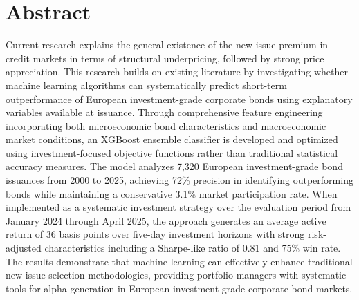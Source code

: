 \chapter*{Abstract}
\thispagestyle{empty} %

Current research explains the general existence of the new issue premium in credit markets in terms of structural underpricing, followed by strong price appreciation. This research builds on existing literature by investigating whether machine learning algorithms can systematically predict short-term outperformance of European investment-grade corporate bonds using explanatory variables available at issuance. Through comprehensive feature engineering incorporating both microeconomic bond characteristics and macroeconomic market conditions, an XGBoost ensemble classifier is developed and optimized using investment-focused objective functions rather than traditional statistical accuracy measures. The model analyzes 7,320 European investment-grade bond issuances from 2000 to 2025, achieving 72\% precision in identifying outperforming bonds while maintaining a conservative 3.1\% market participation rate. When implemented as a systematic investment strategy over the evaluation period from January 2024 through April 2025, the approach generates an average active return of 36 basis points over five-day investment horizons with strong risk-adjusted characteristics including a Sharpe-like ratio of 0.81 and 75\% win rate. The results demonstrate that machine learning can effectively enhance traditional new issue selection methodologies, providing portfolio managers with systematic tools for alpha generation in European investment-grade corporate bond markets.